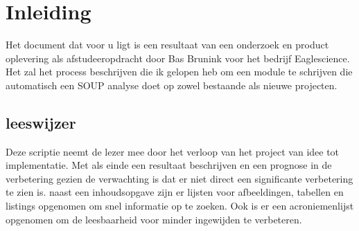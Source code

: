 \chapter{Inleiding} %

\label{ch:Inleiding} %
Het document dat voor u ligt is een resultaat van een onderzoek en product oplevering als afstudeeropdracht door Bas Brunink voor het bedrijf Eaglescience. Het zal het process beschrijven die ik gelopen heb om een module te schrijven die automatisch een SOUP analyse doet op zowel bestaande als nieuwe projecten.

\section{leeswijzer}
Deze scriptie neemt de lezer mee door het verloop van het project van idee tot implementatie. Met als einde een resultaat beschrijven en een prognose in de verbetering gezien de verwachting is dat er niet direct een significante verbetering te zien is.
naast een inhoudsopgave zijn er lijsten voor afbeeldingen, tabellen en listings opgenomen om snel informatie op te zoeken. Ook is er een acroniemenlijst opgenomen om de leesbaarheid voor minder ingewijden te verbeteren.
